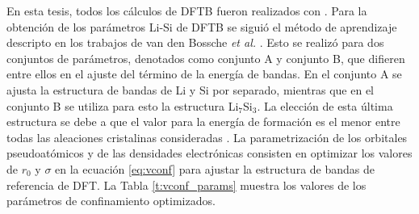 En esta tesis, todos los cálculos de DFTB fueron realizados con  
\cite{dftb+}. Para la obtención de los parámetros Li-Si de DFTB se siguió el 
método de aprendizaje descripto en los trabajos de van den Bossche \textit{et al.}
\cite{van2018, van2019}. Esto se realizó para dos conjuntos de parámetros, 
denotados como conjunto A y conjunto B, que difieren entre ellos en el ajuste
del término de la energía de bandas. En el conjunto A se ajusta la estructura 
de bandas de Li y Si por separado, mientras que en el conjunto B se utiliza para 
esto la estructura Li$_7$Si$_3$. La elección de esta última estructura se debe a
que el valor para la energía de formación es el menor entre todas las aleaciones
cristalinas consideradas \cite{materials_project}. La parametrización de los 
orbitales pseudoatómicos y de las densidades electrónicas consisten en optimizar 
los valores de $r_0$ y $\sigma$ en la ecuación \ref{eq:vconf} para ajustar la 
estructura de bandas de referencia de DFT. La Tabla \ref{t:vconf_params} muestra
los valores de los parámetros de confinamiento optimizados.
\begin{table}[h]
    \centering
    \caption{Parámetros del potencial de confinamiento $r_0$ y $\sigma$ para 
    los orbitales atómicos $\phi$ y las densidades $\rho^0$ de Li y Si}
    \setlength\extrarowheight{2pt}
    \label{t:vconf_params}
\end{table}

